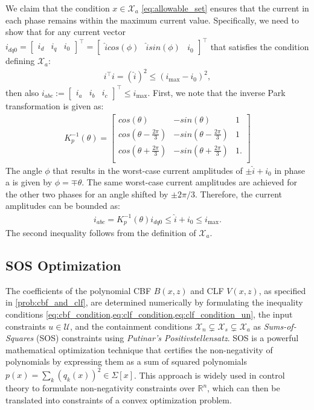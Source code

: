 \documentclass[lettersize,journal]{IEEEtran}
\newcommand{\R}{\mathbb{R}}
\begin{document}
We claim that the condition $x \in \mathcal X_a$ \cref{eq:allowable_set} ensures that the current in each phase remains within the maximum current value.
Specifically, we need to show that for any current vector $i_{dq0} = \begin{bmatrix}i_d & i_q & i_0\end{bmatrix}^\top = \begin{bmatrix} \hat i cos(\phi) & \hat i sin(\phi) & i_0 \end{bmatrix}^\top$ that satisfies the condition defining $\mathcal X_a$:
\begin{align*}
   i^\top i = (\hat i)^2 \leq (i_\text{max} - i_0)^2,
\end{align*}
then also $i_{abc} := \begin{bmatrix}i_a & i_b & i_c\end{bmatrix}^\top \leq i_\text{max}$.
First, we note that the inverse Park transformation is given as:
\begin{align*}
   K_p^{-1}(\theta) = \begin{bmatrix}
      cos(\theta) & -sin(\theta) & 1 \\
      cos(\theta-\frac{2\pi}{3}) & -sin(\theta-\frac{2\pi}{3}) & 1 \\
      cos(\theta+\frac{2\pi}{3}) & -sin(\theta+\frac{2\pi}{3}) & 1. \\
   \end{bmatrix}
\end{align*}
The angle $\phi$ that results in the worst-case current amplitudes of $\pm \hat i + i_0$ in phase a is given by $\phi = \mp \theta$.
The same worst-case current amplitudes are achieved for the other two phases for an angle shifted by $\pm 2 \pi /3$.
Therefore, the current amplitudes can be bounded as:
\begin{align*}
   i_{abc} = K_p^{-1}(\theta) i_{dq0} \leq \hat i + i_0 \leq i_\text{max}.
\end{align*}
The second inequality follows from the definition of $\mathcal X_a$.


\subsection{SOS Optimization} \label{sec:sos_optimization}

The coefficients of the polynomial CBF $B(x, z)$ and CLF $V(x, z)$, as specified in \cref{prob:cbf_and_clf}, are determined numerically by formulating the inequality conditions \cref{eq:cbf_condition,eq:clf_condition,eq:clf_condition_un}, the input constraints $u \in \mathcal U$, and the containment conditions $\mathcal X_n \subsetneq \mathcal X_s \subsetneq \mathcal X_a$ as \textit{Sums-of-Squares} (SOS) constraints using \textit{Putinar's Positivstellensatz}.
SOS is a powerful mathematical optimization technique that certifies the non-negativity of polynomials by expressing them as a sum of squared polynomials $p(x) = \sum_k \left ( q_k(x) \right )^2 \in \Sigma[x]$.
This approach is widely used in control theory to formulate non-negativity constraints over $\R^n$, which can then be translated into constraints of a convex optimization problem.
\end{document}
